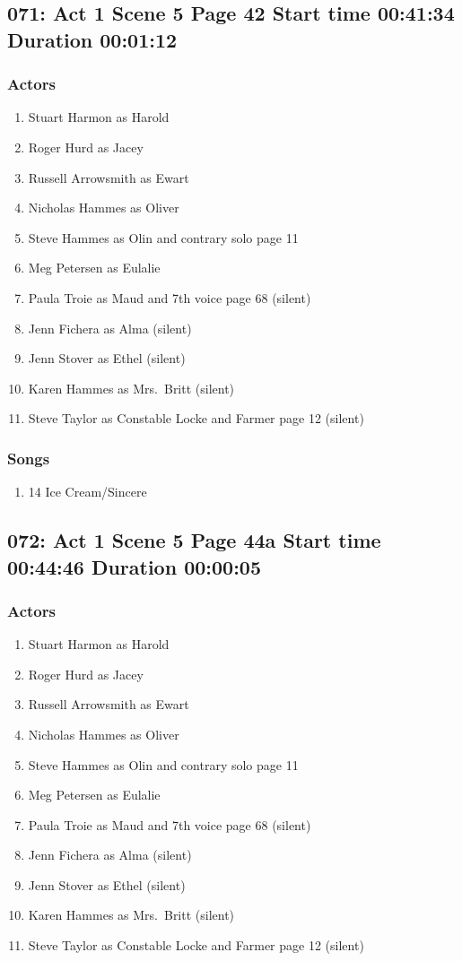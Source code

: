 \subsection{071: Act 1 Scene 5 Page 42 Start time 00:41:34 Duration 00:01:12}

\subsubsection{Actors}
\begin{enumerate}
\item Stuart Harmon as Harold
\item Roger Hurd as Jacey
\item Russell Arrowsmith as Ewart
\item Nicholas Hammes as Oliver
\item Steve Hammes as Olin and contrary solo page 11
\item Meg Petersen as Eulalie
\item Paula Troie as Maud and 7th voice page 68 (silent)
\item Jenn Fichera as Alma (silent)
\item Jenn Stover as Ethel (silent)
\item Karen Hammes as Mrs.~Britt (silent)
\item Steve Taylor as Constable Locke and Farmer page 12 (silent)
\end{enumerate}

\subsubsection{Songs}
\begin{enumerate}
\item 14 Ice Cream/Sincere
\end{enumerate}
\subsection{072: Act 1 Scene 5 Page 44a Start time 00:44:46 Duration 00:00:05}

\subsubsection{Actors}
\begin{enumerate}
\item Stuart Harmon as Harold
\item Roger Hurd as Jacey
\item Russell Arrowsmith as Ewart
\item Nicholas Hammes as Oliver
\item Steve Hammes as Olin and contrary solo page 11
\item Meg Petersen as Eulalie
\item Paula Troie as Maud and 7th voice page 68 (silent)
\item Jenn Fichera as Alma (silent)
\item Jenn Stover as Ethel (silent)
\item Karen Hammes as Mrs.~Britt (silent)
\item Steve Taylor as Constable Locke and Farmer page 12 (silent)
\end{enumerate}

